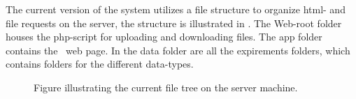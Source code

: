 The current version of the system utilizes a file structure to organize html- and file requests on the server, the structure is illustrated in . The Web-root folder houses the php-script for uploading and downloading files. The app folder contains the \appName\ web page. In the data folder are all the expirements folders, which contains folders for the different data-types.

\begin{figure}[hbt]
\caption{Figure illustrating the current file tree on the server machine.}
\label{fig:exp_filestructure}
\end{figure}